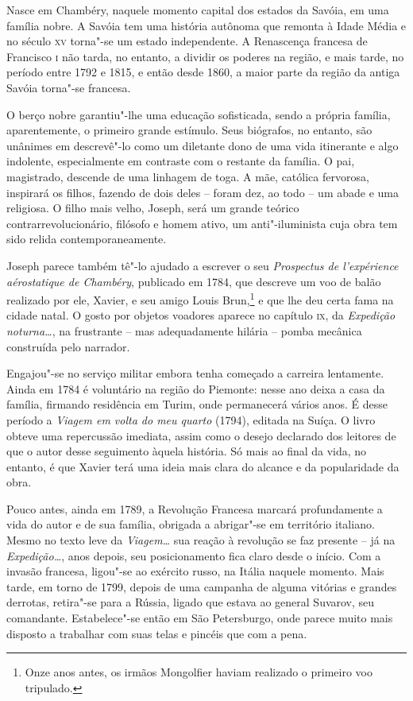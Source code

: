 Nasce em Chambéry, naquele momento capital dos estados da Savóia, em uma
família nobre. A Savóia tem uma história autônoma que remonta à Idade
Média e no século \textsc{xv} torna"-se um estado independente. A Renascença
francesa de Francisco \textsc{i} não tarda, no entanto, a dividir os poderes na
região, e mais tarde, no período entre 1792 e 1815, e então desde 1860,
a maior parte da região da antiga Savóia torna"-se francesa. 

O berço nobre garantiu"-lhe uma educação sofisticada, sendo a própria
família, aparentemente, o primeiro grande estímulo. Seus biógrafos, no
entanto, são unânimes em descrevê"-lo como um diletante dono de uma
vida itinerante e algo indolente, especialmente em contraste com o
restante da família. O pai, magistrado, descende de uma linhagem de
toga. A mãe, católica fervorosa, inspirará os filhos, fazendo de dois
deles -- foram dez, ao todo -- um abade e uma religiosa. O filho mais
velho, Joseph, será um grande teórico contrarrevolucionário, filósofo e
homem ativo,  um anti"-iluminista cuja obra tem sido relida
contemporaneamente. 

 Joseph parece também tê"-lo ajudado a escrever o seu \textit{Prospectus
de l’expérience aérostatique de Chambéry}, publicado em 1784, que
descreve um voo de balão realizado por ele, Xavier, e seu amigo Louis
Brun,\footnote{ Onze anos antes, os irmãos Mongolfier haviam realizado o
primeiro voo tripulado.} e que lhe deu certa fama na cidade natal. O
gosto por objetos voadores aparece no capítulo \textsc{ix}, da \textit{Expedição
noturna\ldots}, na frustrante -- mas adequadamente hilária -- pomba mecânica
construída pelo narrador. 

Engajou"-se no serviço militar embora tenha começado a carreira
lentamente. Ainda em 1784 é voluntário na região do Piemonte: nesse ano
deixa a casa da família, firmando residência em Turim, onde permanecerá
vários anos. É desse período a \textit{Viagem em volta do meu quarto}
(1794), editada na Suíça. O livro obteve uma repercussão imediata,
assim como o desejo declarado dos leitores de que o autor desse
seguimento àquela história. Só mais ao final da vida, no entanto, é que
Xavier terá uma ideia mais clara do alcance e da popularidade da obra. 

Pouco antes, ainda em 1789, a Revolução Francesa marcará profundamente a
vida do autor e de sua família, obrigada a abrigar"-se em território
italiano. Mesmo no texto leve da \textit{Viagem\ldots} sua reação à
revolução se faz presente -- já na \textit{Expedição\ldots}, anos depois,
seu posicionamento fica claro desde o início. Com a invasão francesa,
ligou"-se ao exército russo, na Itália naquele momento. Mais tarde, em
torno de 1799, depois de uma campanha de alguma vitórias e grandes
derrotas, retira"-se para a Rússia, ligado que estava ao general
Suvarov, seu comandante. Estabelece"-se então em São Petersburgo, onde
parece muito mais disposto a trabalhar com suas telas e pincéis que com
a pena.

